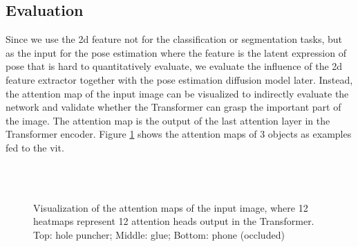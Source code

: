 \documentclass[12pt,DIV14,BCOR12mm,a4paper,footinclude=false,headinclude,parskip=half-,twoside,openright,cleardoublepage=empty,toc=index,bibliography=totoc,listof=totoc]{scrreprt}
\numberwithin{equation}{chapter}
\begin{document}
\subsection{Evaluation}
Since we use the \gls{2d} feature not for the classification or segmentation tasks, but as the input for the pose estimation where the feature is the latent expression of pose that is hard to quantitatively evaluate, we evaluate the influence of the \gls{2d} feature extractor together with the pose estimation diffusion model later. Instead, the attention map of the input image can be visualized to indirectly evaluate the network and validate whether the Transformer can grasp the important part of the image. The attention map is the output of the last attention layer in the Transformer encoder. Figure \ref{img:atten} shows the attention maps of 3 objects as examples fed to the \gls{vit}.

\begin{figure}[h]
  \centering
   \\
  \centering
   \\
  \centering
  \caption{Visualization of the attention maps of the input image, where 12 heatmaps represent 12 attention heads output in the Transformer. Top: hole puncher; Middle: glue; Bottom: phone (occluded)}
  \label{img:atten}
\end{figure}
\end{document}

